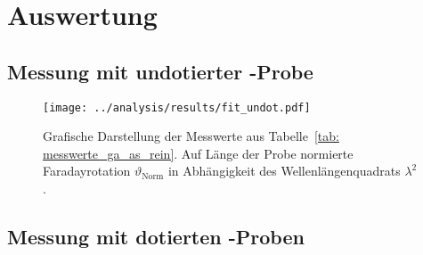 \section{Auswertung}


\subsection{Messung mit undotierter -Probe}



\begin{figure}
\centering
\texttt{[image: ../analysis/results/fit\_undot.pdf]}
\caption{Grafische Darstellung der Messwerte aus Tabelle~\ref{tab: messwerte_ga_as_rein}. Auf Länge der Probe normierte 
Faradayrotation $\vartheta_{\text{Norm}}$ in Abhängigkeit des Wellenlängenquadrats $\lambda^2$. }
\label{fig: ga_as_rein}
\end{figure}


\subsection{Messung mit dotierten -Proben}











